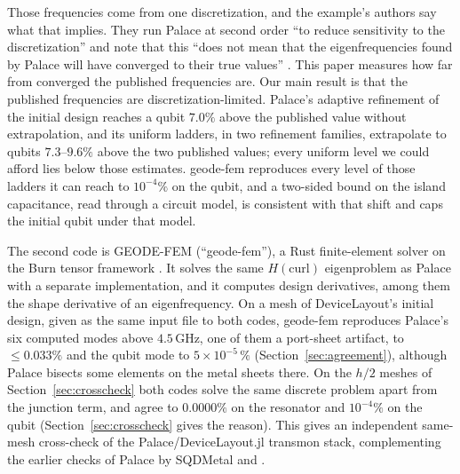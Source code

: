 \documentclass{anvil-paper}
\begin{document}
Those frequencies come from one discretization, and the example's authors
say what that implies. They run Palace at second order ``to reduce
sensitivity to the discretization'' and note that this ``does not mean that
the eigenfrequencies found by Palace will have converged to their true
values'' \citep{devicelayout-example}. This paper measures
how far from converged the published frequencies are. Our
main result is that the published frequencies are discretization-limited.
Palace's adaptive refinement of the initial design reaches a qubit $7.0\%$ above the
published value without extrapolation, and its uniform ladders, in two
refinement families, extrapolate to qubits $7.3$--$9.6\%$ above the two
published values; every uniform level we could afford lies below those
estimates. geode-fem reproduces every
level of those ladders it can reach to $10^{-4}\%$ on the qubit, and a
two-sided bound on the island capacitance, read through a circuit model, is
consistent with that shift and caps the initial qubit under that model.

The second code is GEODE-FEM (``geode-fem''), a Rust finite-element solver
on the Burn tensor framework \citep{burn}. It solves the same
$H(\mathrm{curl})$ eigenproblem as Palace with a separate implementation,
and it computes design derivatives, among them the shape derivative of an
eigenfrequency. On a mesh of DeviceLayout's initial design, given as the
same input file to both codes, geode-fem reproduces Palace's six computed
modes above $4.5$\,GHz, one of them a port-sheet artifact, to
$\leq 0.033\%$ and the qubit mode to $5\times10^{-5}\,\%$
(Section~\ref{sec:agreement}), although Palace bisects some elements on
the metal sheets there. On the $h/2$ meshes of
Section~\ref{sec:crosscheck} both codes solve the same discrete problem
apart from the junction term, and agree to $0.0000\%$ on the resonator and
$10^{-4}\%$ on the qubit (Section~\ref{sec:crosscheck} gives the
reason). This gives an independent
same-mesh cross-check of the Palace/DeviceLayout.jl transmon stack,
complementing the earlier checks of Palace by SQDMetal
\citep{sommers2025open} and \citet{ye2025electromagnetic}.
\end{document}
